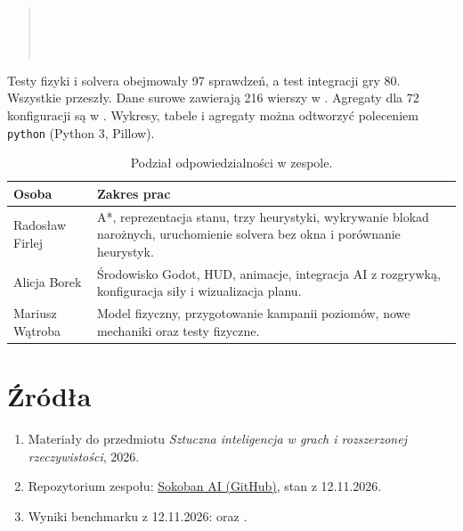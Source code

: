 \documentclass[a4paper,11pt]{article}
\begin{document}
\begin{samepage}
\begin{quote}\footnotesize\ttfamily
{}\\
\\
\\
\end{quote}
\end{samepage}

Testy fizyki i solvera obejmowały 97 sprawdzeń, a test integracji gry 80. Wszystkie przeszły. Dane surowe zawierają 216 wierszy w . Agregaty dla 72 konfiguracji są w . Wykresy, tabele i agregaty można odtworzyć poleceniem \texttt{python}  (Python 3, Pillow).

\begin{table}[H]
\centering
\caption{Podział odpowiedzialności w zespole.}
\begin{tabularx}{\linewidth}{@{}p{3.1cm}X@{}}
\toprule
Osoba & Zakres prac \\
\midrule
Radosław Firlej & A*, reprezentacja stanu, trzy heurystyki, wykrywanie blokad narożnych, uruchomienie solvera bez okna i porównanie heurystyk. \\
Alicja Borek & Środowisko Godot, HUD, animacje, integracja AI z rozgrywką, konfiguracja siły i wizualizacja planu. \\
Mariusz Wątroba & Model fizyczny, przygotowanie kampanii poziomów, nowe mechaniki oraz testy fizyczne. \\
\bottomrule
\end{tabularx}
\end{table}

\section*{Źródła}
\begin{enumerate}
\item Materiały do przedmiotu \emph{Sztuczna inteligencja w grach i rozszerzonej rzeczywistości}, 2026.
\item Repozytorium zespołu: \href{https://github.com/Man1ek27/Sokoban-ai}{Sokoban AI (GitHub)}, stan z 12.11.2026.
\item Wyniki benchmarku z 12.11.2026:  oraz .
\end{enumerate}
\end{document}
